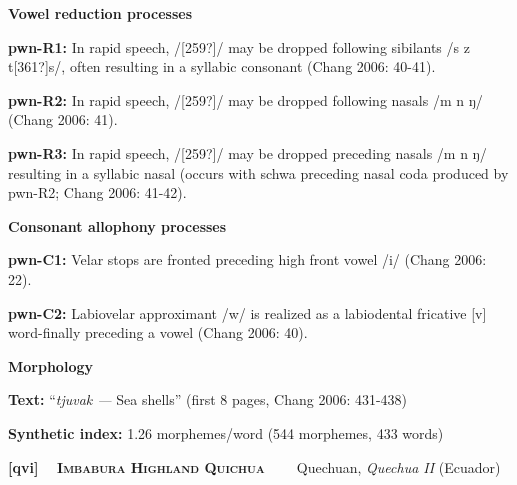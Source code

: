 \begin{styleBody}
\textbf{Vowel reduction processes}
\end{styleBody}

\begin{styleBody}
\textbf{pwn-R1:} In rapid speech, /[259?]/ may be dropped following sibilants /s z t[361?]s/, often resulting in a syllabic consonant (Chang 2006: 40-41).
\end{styleBody}

\begin{styleBody}
\textbf{pwn-R2:} In rapid speech, /[259?]/ may be dropped following nasals /m n ŋ/ (Chang 2006: 41).
\end{styleBody}

\begin{styleBody}
\textbf{pwn-R3:} In rapid speech, /[259?]/ may be dropped preceding nasals /m n ŋ/ resulting in a syllabic nasal (occurs with schwa preceding nasal coda produced by pwn-R2; Chang 2006: 41-42).
\end{styleBody}

\begin{styleBody}
\textbf{Consonant allophony processes}
\end{styleBody}

\begin{styleBody}
\textbf{pwn-C1:} Velar stops are fronted preceding high front vowel /i/ (Chang 2006: 22).
\end{styleBody}

\begin{styleBody}
\textbf{pwn-C2:} Labiovelar approximant /w/ is realized as a labiodental fricative [v] word-finally preceding a vowel (Chang 2006: 40).
\end{styleBody}

\begin{styleBody}
\textbf{Morphology}
\end{styleBody}

\begin{styleBody}
\textbf{Text:} “\textit{tjuvak — }Sea shells” (first 8 pages, Chang 2006: 431-438)
\end{styleBody}

\begin{styleBody}
\textbf{Synthetic index: }1.26 morphemes/word (544 morphemes, 433 words)
\end{styleBody}

\clearpage\begin{styleBody}
\textbf{[qvi] }\ \ \textbf{\textsc{Imbabura Highland Quichua}}\textbf{\ \ \ \ }Quechuan, \textit{Quechua II} (Ecuador)
\end{styleBody}

